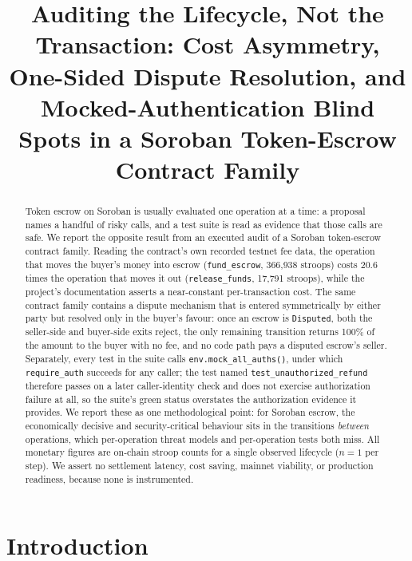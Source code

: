 \documentclass[sigconf,review]{acmart}
\begin{document}
\title{Auditing the Lifecycle, Not the Transaction: Cost Asymmetry,
       One-Sided Dispute Resolution, and Mocked-Authentication Blind Spots
       in a Soroban Token-Escrow Contract Family}

\begin{abstract}
Token escrow on Soroban is usually evaluated one operation at a time: a
proposal names a handful of risky calls, and a test suite is read as evidence
that those calls are safe. We report the opposite result from an executed
audit of a Soroban token-escrow contract family. Reading the contract's own
recorded testnet fee data, the operation that moves the buyer's money into
escrow (\texttt{fund\_escrow}, 366{,}938 stroops) costs 20.6 times the
operation that moves it out (\texttt{release\_funds}, 17{,}791 stroops), while
the project's documentation asserts a near-constant per-transaction cost. The
same contract family contains a dispute mechanism that is entered
symmetrically by either party but resolved only in the buyer's favour: once an
escrow is \texttt{Disputed}, both the seller-side and buyer-side exits reject,
the only remaining transition returns 100\% of the amount to the buyer with no
fee, and no code path pays a disputed escrow's seller. Separately, every test
in the suite calls \texttt{env.mock\_all\_auths()}, under which
\texttt{require\_auth} succeeds for any caller; the test named
\texttt{test\_unauthorized\_refund} therefore passes on a later caller-identity
check and does not exercise authorization failure at all, so the suite's green
status overstates the authorization evidence it provides. We report these as
one methodological point: for Soroban escrow, the economically decisive and
security-critical behaviour sits in the transitions \emph{between} operations,
which per-operation threat models and per-operation tests both miss. All
monetary figures are on-chain stroop counts for a single observed lifecycle
($n=1$ per step). We assert no settlement latency, cost saving, mainnet
viability, or production readiness, because none is instrumented.
\end{abstract}

\section{Introduction}
\label{sec:intro}
\end{document}
